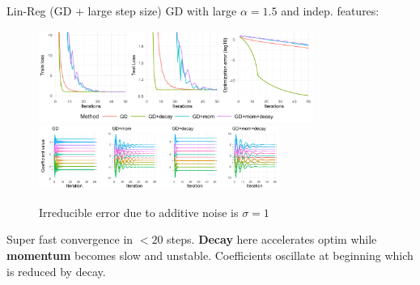 \documentclass[11pt,compress,t,notes=noshow, xcolor=table]{beamer}
\begin{document}
\begin{vbframe}{Lin-Reg (GD + large step size)}
\vspace{-0.5cm}
GD with large $\alpha=1.5$ and indep. features:
\begin{figure}
            \includegraphics[width=0.8\textwidth]{slides/04-multivariate-first-order/figure_man/simu_linmod/GD_reg_large_lr_iters.pdf} \\
             \includegraphics[width=0.7\textwidth]{slides/04-multivariate-first-order/figure_man/simu_linmod/GD_reg_coef_large.pdf}\\
            \begin{footnotesize}
                Irreducible error due to additive noise is $\sigma=1$
            \end{footnotesize}
\end{figure}
Super fast convergence in $<20$ steps. \textbf{Decay} here accelerates optim while \textbf{momentum} becomes slow and unstable. Coefficients oscillate at beginning which is reduced by decay.
\end{vbframe}


\end{document}
